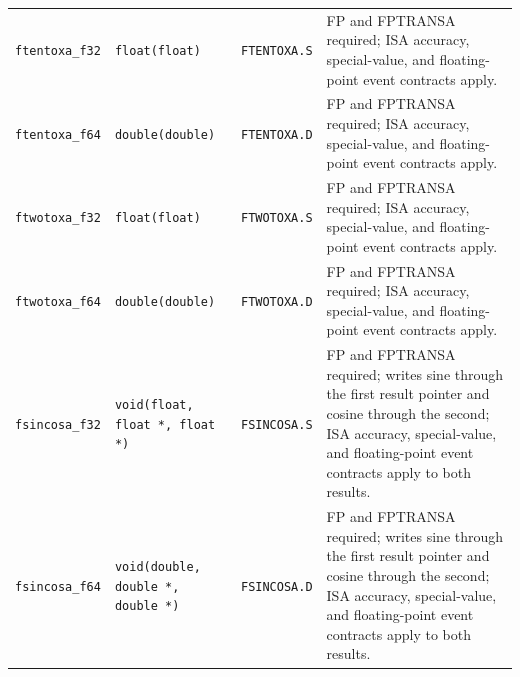 \begin{longtable}{@{}p{1.25in}p{1.3in}p{0.85in}p{2.2in}@{}}
\texttt{ftentoxa\_f32} & \texttt{float(float)} & \texttt{FTENTOXA.S} & FP and FPTRANSA required; ISA accuracy, special-value, and floating-point event contracts apply.\\
\texttt{ftentoxa\_f64} & \texttt{double(double)} & \texttt{FTENTOXA.D} & FP and FPTRANSA required; ISA accuracy, special-value, and floating-point event contracts apply.\\
\texttt{ftwotoxa\_f32} & \texttt{float(float)} & \texttt{FTWOTOXA.S} & FP and FPTRANSA required; ISA accuracy, special-value, and floating-point event contracts apply.\\
\texttt{ftwotoxa\_f64} & \texttt{double(double)} & \texttt{FTWOTOXA.D} & FP and FPTRANSA required; ISA accuracy, special-value, and floating-point event contracts apply.\\
\texttt{fsincosa\_f32} & \texttt{void(float, float *, float *)} & \texttt{FSINCOSA.S} & FP and FPTRANSA required; writes sine through the first result pointer and cosine through the second; ISA accuracy, special-value, and floating-point event contracts apply to both results.\\
\texttt{fsincosa\_f64} & \texttt{void(double, double *, double *)} & \texttt{FSINCOSA.D} & FP and FPTRANSA required; writes sine through the first result pointer and cosine through the second; ISA accuracy, special-value, and floating-point event contracts apply to both results.\\
\bottomrule
\end{longtable}
\endgroup
